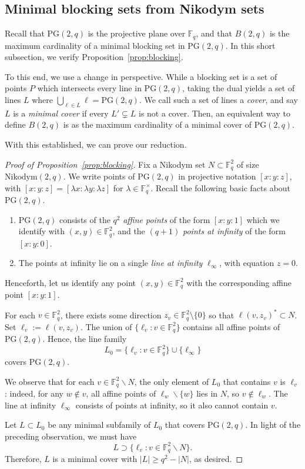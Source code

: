 \documentclass[12pt,reqno]{amsart}
\theoremstyle{plain}
\theoremstyle{definition}
\newcommand{\F}{\mathbb{F}}
\newcommand{\PG}{\mathrm{PG}}
\newcommand{\Nik}{\mathrm{Nikodym}}
\newcommand{\1}{\mathbf{1}}
\newcommand{\abs}[1]{\left|#1\right|}
\begin{document}
\subsection{Minimal blocking sets from Nikodym sets}
Recall that $\PG(2,q)$ is the projective plane over $\F_q$, and that $B(2,q)$ is the maximum cardinality of a minimal blocking set in $\PG(2,q)$. In this short subsection, we verify Proposition~\ref{prop:blocking}. 

To this end, we use a change in perspective. While a blocking set is a set of points $P$ which intersects every line in $\PG(2, q)$, taking the dual yields a set of lines $L$ where $\bigcup_{\ell\in L}\ell = \PG(2, q)$. We call such a set of lines a \textit{cover}, and say $L$ is a \textit{minimal cover} if every $L'\subsetneq L$ is not a cover. Then, an equivalent way to define $B(2, q)$ is as the maximum cardinality of a minimal cover of $\PG(2, q)$.

With this established, we can prove our reduction.
\begin{proof}[Proof of Proposition~\ref{prop:blocking}] 

Fix a Nikodym set $N\subset \F_q^2$ of size $\Nik(2,q)$. We write points of $\PG(2, q)$ in projective notation $[x:y:z]$, with $[x:y:z] = [\lambda x: \lambda y: \lambda z]$ for $\lambda \in \F_q^{\times}$. Recall the following basic facts about $\PG(2, q)$.
\begin{enumerate}
    \item $\PG(2, q)$ consists of the $q^2$ \emph{affine points} of the form $[x: y: 1]$ which we identify with $(x, y) \in \F_q^2$, and the $(q + 1)$ \emph{points at infinity} of the form $[x:y:0]$.
    \item The points at infinity lie on a single \emph{line at infinity} $\ell_\infty$, with equation $z = 0$.
\end{enumerate}
\noindent Henceforth, let us identify any point $(x,y)\in \F_q^2$ with the corresponding affine point $[x:y:1]$.

For each $v\in \F_q^2$, there exists some direction $z_v\in \F_q^2\setminus\{0\}$ so that $\ell(v,z_v)^*\subset N$. Set $\ell_v:=\ell(v,z_v)$. The union of $\{\ell_v:v\in \F_q^2\}$ contains all affine points of $\PG(2, q)$. Hence, the line family
$$L_0 = \{\ell_v:v\in \F_q^2\} \cup \{\ell_\infty\}$$
covers $\PG(2, q)$.

We observe that for each $v \in \F_q^2\backslash N$, the only element of $L_0$ that contains $v$ is $\ell_v$: indeed, for any $w \notin v$, all affine points of $\ell_w \backslash \{w\}$ lies in $N$, so $v \notin \ell_w$. The line at infinity $\ell_\infty$ consists of points at infinity, so it also cannot contain $v$.

Let $L \subset L_0$ be any minimal subfamily of $L_0$ that covers $\PG(2, q)$. In light of the preceding observation, we must have
$$L \supset \{\ell_v: v \in \F_q^2\backslash N\}.$$
Therefore, $L$ is a minimal cover with $\abs{L} \geq q^2 - \abs{N}$, as desired.
\end{proof}
\end{document}
